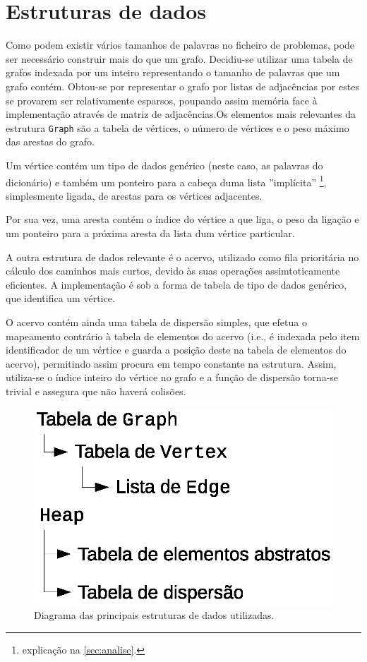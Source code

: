\documentclass[a4paper, 18pt]{article}
\begin{document}
\section{Estruturas de dados}
	\par
	Como podem existir vários tamanhos de palavras no ficheiro de problemas, pode ser necessário construir mais do que um grafo. Decidiu-se utilizar uma tabela de grafos indexada por um inteiro representando o tamanho de palavras que um grafo contém. Obtou-se por representar o grafo por listas de adjacências por estes se provarem ser relativamente esparsos, poupando assim memória face à implementação através de matriz de adjacências.Os elementos mais relevantes da estrutura \texttt{Graph} são a tabela de vértices, o número de vértices e o peso máximo das arestas do grafo.
	\par
	Um vértice contém um tipo de dados genérico (neste caso, as palavras do dicionário) e também um ponteiro para a cabeça duma lista ''implícita'' \footnote{explicação na \autoref{sec:analise}.}, simplesmente ligada, de arestas para os vértices adjacentes.
	\par
	Por sua vez, uma aresta contém o índice do vértice a que liga, o peso da ligação e um ponteiro para a próxima aresta da lista dum vértice particular.
	\par\null\par
	A outra estrutura de dados relevante é o acervo, utilizado como fila prioritária no cálculo dos caminhos mais curtos, devido às suas operações assimtoticamente eficientes. A implementação é sob a forma de tabela de tipo de dados genérico, que identifica um vértice.
	\par
	O acervo contém ainda uma tabela de dispersão simples, que efetua o mapeamento contrário à tabela de elementos do acervo (i.e., é indexada pelo item identificador de um vértice e guarda a posição deste na tabela de elementos do acervo), permitindo assim procura em tempo constante na estrutura. Assim, utiliza-se o índice inteiro do vértice no grafo e a função de dispersão torna-se trivial e assegura que não haverá colisões.
	\begin{figure}[H]
		\centering
		\includegraphics[width=0.4\linewidth]{data}
		\caption{Diagrama das principais estruturas de dados utilizadas.}
	\end{figure}
\end{document}

